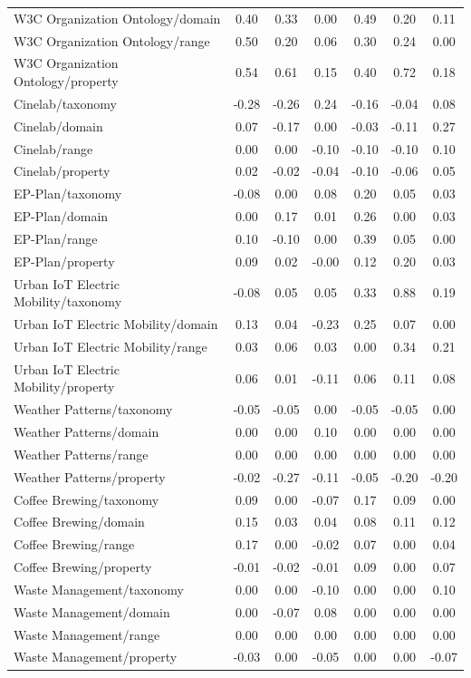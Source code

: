 \begin{tabular}{lcccccc}
W3C Organization Ontology/domain & 0.40 & 0.33 & 0.00 & 0.49 & 0.20 & 0.11 \\
W3C Organization Ontology/range & 0.50 & 0.20 & 0.06 & 0.30 & 0.24 & 0.00 \\
W3C Organization Ontology/property & 0.54 & 0.61 & 0.15 & 0.40 & 0.72 & 0.18 \\
Cinelab/taxonomy & -0.28 & -0.26 & 0.24 & -0.16 & -0.04 & 0.08 \\
Cinelab/domain & 0.07 & -0.17 & 0.00 & -0.03 & -0.11 & 0.27 \\
Cinelab/range & 0.00 & 0.00 & -0.10 & -0.10 & -0.10 & 0.10 \\
Cinelab/property & 0.02 & -0.02 & -0.04 & -0.10 & -0.06 & 0.05 \\
EP-Plan/taxonomy & -0.08 & 0.00 & 0.08 & 0.20 & 0.05 & 0.03 \\
EP-Plan/domain & 0.00 & 0.17 & 0.01 & 0.26 & 0.00 & 0.03 \\
EP-Plan/range & 0.10 & -0.10 & 0.00 & 0.39 & 0.05 & 0.00 \\
EP-Plan/property & 0.09 & 0.02 & -0.00 & 0.12 & 0.20 & 0.03 \\
Urban IoT Electric Mobility/taxonomy & -0.08 & 0.05 & 0.05 & 0.33 & 0.88 & 0.19 \\
Urban IoT Electric Mobility/domain & 0.13 & 0.04 & -0.23 & 0.25 & 0.07 & 0.00 \\
Urban IoT Electric Mobility/range & 0.03 & 0.06 & 0.03 & 0.00 & 0.34 & 0.21 \\
Urban IoT Electric Mobility/property & 0.06 & 0.01 & -0.11 & 0.06 & 0.11 & 0.08 \\
Weather Patterns/taxonomy & -0.05 & -0.05 & 0.00 & -0.05 & -0.05 & 0.00 \\
Weather Patterns/domain & 0.00 & 0.00 & 0.10 & 0.00 & 0.00 & 0.00 \\
Weather Patterns/range & 0.00 & 0.00 & 0.00 & 0.00 & 0.00 & 0.00 \\
Weather Patterns/property & -0.02 & -0.27 & -0.11 & -0.05 & -0.20 & -0.20 \\
Coffee Brewing/taxonomy & 0.09 & 0.00 & -0.07 & 0.17 & 0.09 & 0.00 \\
Coffee Brewing/domain & 0.15 & 0.03 & 0.04 & 0.08 & 0.11 & 0.12 \\
Coffee Brewing/range & 0.17 & 0.00 & -0.02 & 0.07 & 0.00 & 0.04 \\
Coffee Brewing/property & -0.01 & -0.02 & -0.01 & 0.09 & 0.00 & 0.07 \\
Waste Management/taxonomy & 0.00 & 0.00 & -0.10 & 0.00 & 0.00 & 0.10 \\
Waste Management/domain & 0.00 & -0.07 & 0.08 & 0.00 & 0.00 & 0.00 \\
Waste Management/range & 0.00 & 0.00 & 0.00 & 0.00 & 0.00 & 0.00 \\
Waste Management/property & -0.03 & 0.00 & -0.05 & 0.00 & 0.00 & -0.07 \\
\bottomrule
\end{tabular}
